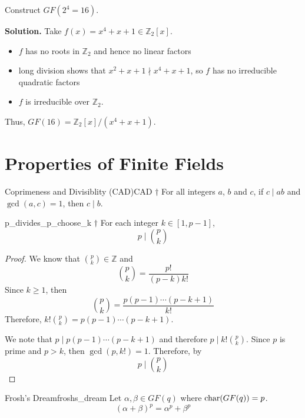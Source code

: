 
\begin{Example}{}{}
    Construct $ GF(2^4=16) $.

    \textbf{Solution.} Take $ f(x)=x^4+x+1\in\mathbb{Z}_2[x] $.
    \begin{itemize}
        \item $ f $ has no roots in $ \mathbb{Z}_2 $ and hence no linear factors
        \item long division shows that $ x^2+x+1\nmid x^4+x+1 $, so $ f $
              has no irreducible quadratic factors
        \item $ f $ is irreducible over $ \mathbb{Z}_2 $.
    \end{itemize}
    Thus, $ GF(16)=\mathbb{Z}_2[x]/(x^4+x+1) $.
\end{Example}

\section{Properties of Finite Fields}

\begin{Proposition}{Coprimeness and Divisiblity (CAD)}{CAD}
    $ \dagger $ For all integers $ a $, $ b $ and $ c $, if $ c\mid ab $
    and $ \gcd(a,c)=1 $, then $ c\mid b $.
\end{Proposition}

\begin{Lemma}{}{p_divides_p_choose_k}
    $ \dagger $ For each integer $ k\in[1,p-1] $,
    \[ p\mid \binom{p}{k} \]
\end{Lemma}

\begin{proof}
    We know that $ \binom{p}{k}\in\mathbb{Z} $ and
    \[ \binom{p}{k}=\frac{p!}{(p-k)k!} \]
    Since $ k\geqslant 1 $, then
    \[ \binom{p}{k}=\frac{p(p-1)\cdots(p-k+1)}{k!} \]
    Therefore, $ k!\binom{p}{k}=p(p-1)\cdots(p-k+1) $.

    We note that $ p\mid p(p-1)\cdots(p-k+1) $ and therefore
    $ p\mid k!\binom{p}{k} $. Since $ p $ is prime and $ p>k $,
    then $ \gcd(p,k!)=1 $. Therefore, by~
    \[ p\mid \binom{p}{k} \]
\end{proof}

\begin{Theorem}{Frosh's Dream}{froshs_dream}
    Let $ \alpha,\beta\in GF(q) $ where $ \operatorname{char}(GF(q))=p $.
    \[ (\alpha + \beta)^p=\alpha^p+\beta^p \]
\end{Theorem}

